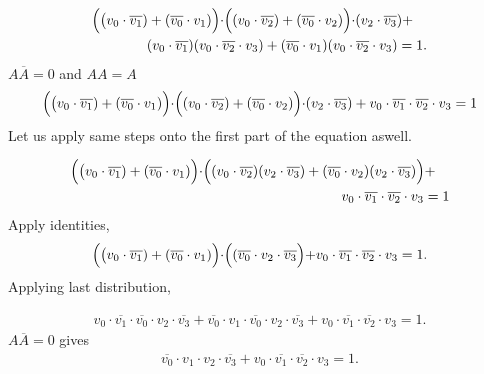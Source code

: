 \begin{equation}
    \begin{multlined}
        \Bigl( \big(v_0 \cdot \overline{v_1})+(\overline{v_0} \cdot v_1) \Bigl) \cdot \Bigl( (v_0 \cdot \overline{v_2})+(\overline{v_0} \cdot v_2) \Bigl) \cdot  (v_2 \cdot \overline{v_3})+ 
        \\
        ( v_0 \cdot \overline{v_1})(v_0 \cdot \overline{v_2} \cdot v_3) + (\overline{v_0} \cdot v_1)(v_0 \cdot \overline{v_2} \cdot v_3) = 1.
        \end{multlined}
\end{equation}
$A\overline{A}=0$ and $AA=A$
\begin{equation}
    \begin{multlined}
        \Bigl( \big(v_0 \cdot \overline{v_1})+(\overline{v_0} \cdot v_1) \Bigl) \cdot \Bigl( (v_0 \cdot \overline{v_2})+(\overline{v_0} \cdot v_2) \Bigl) \cdot  (v_2 \cdot \overline{v_3})+ v_0 \cdot \overline{v_1} \cdot \overline{v_2} \cdot v_3 =1
        \end{multlined}
\end{equation}
Let us apply same steps onto the first part of the equation aswell. 

\begin{equation}
    \begin{multlined}
        \Bigl( \big(v_0 \cdot \overline{v_1})+(\overline{v_0} \cdot v_1) \Bigl) \cdot \Bigl((v_0 \cdot \overline{v_2})(v_2 \cdot \overline{v_3})+(\overline{v_0} \cdot v_2)(v_2 \cdot \overline{v_3})\Bigl) +
        \\
        v_0 \cdot \overline{v_1} \cdot \overline{v_2} \cdot v_3 =1
        \end{multlined}
\end{equation}
Apply identities,
\begin{equation}
    \begin{multlined}
        \Bigl( \big(v_0 \cdot \overline{v_1})+(\overline{v_0} \cdot v_1) \Bigl) \cdot \Bigl( (\overline{v_0} \cdot v_2 \cdot \overline{v_3}\Bigl) +
        v_0 \cdot \overline{v_1} \cdot \overline{v_2} \cdot v_3 =1.
        \end{multlined}
\end{equation}
Applying last distribution,

\begin{equation}
    \begin{multlined}    
        v_0 \cdot \overline{v_1} \cdot\overline{v_0} \cdot v_2 \cdot \overline{v_3} + \overline{v_0} \cdot v_1 \cdot \overline{v_0} \cdot v_2 \cdot  \overline{v_3}+
        v_0 \cdot \overline{v_1} \cdot \overline{v_2} \cdot v_3 =1.
        \end{multlined}
\end{equation}
$A\overline{A}=0$ gives
\begin{equation}
    \begin{multlined}    
       \overline{v_0} \cdot v_1 \cdot v_2 \cdot \overline{v_3}+
        v_0 \cdot \overline{v_1} \cdot \overline{v_2} \cdot v_3 =1.
        \end{multlined}
\end{equation}

